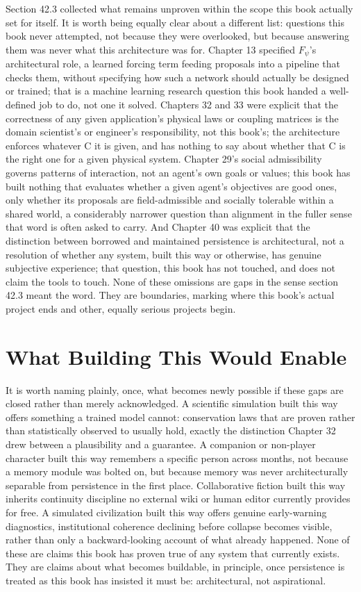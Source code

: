 Section 42.3 collected what remains unproven within the scope this book actually set for itself. It is worth being equally clear about a different list: questions this book never attempted, not because they were overlooked, but because answering them was never what this architecture was for. Chapter 13 specified \(F_\psi\)'s architectural role, a learned forcing term feeding proposals into a pipeline that checks them, without specifying how such a network should actually be designed or trained; that is a machine learning research question this book handed a well-defined job to do, not one it solved. Chapters 32 and 33 were explicit that the correctness of any given application's physical laws or coupling matrices is the domain scientist's or engineer's responsibility, not this book's; the architecture enforces whatever C it is given, and has nothing to say about whether that C is the right one for a given physical system. Chapter 29's social admissibility governs patterns of interaction, not an agent's own goals or values; this book has built nothing that evaluates whether a given agent's objectives are good ones, only whether its proposals are field-admissible and socially tolerable within a shared world, a considerably narrower question than alignment in the fuller sense that word is often asked to carry. And Chapter 40 was explicit that the distinction between borrowed and maintained persistence is architectural, not a resolution of whether any system, built this way or otherwise, has genuine subjective experience; that question, this book has not touched, and does not claim the tools to touch. None of these omissions are gaps in the sense section 42.3 meant the word. They are boundaries, marking where this book's actual project ends and other, equally serious projects begin.

\section{What Building This Would Enable}

It is worth naming plainly, once, what becomes newly possible if these gaps are closed rather than merely acknowledged. A scientific simulation built this way offers something a trained model cannot: conservation laws that are proven rather than statistically observed to usually hold, exactly the distinction Chapter 32 drew between a plausibility and a guarantee. A companion or non-player character built this way remembers a specific person across months, not because a memory module was bolted on, but because memory was never architecturally separable from persistence in the first place. Collaborative fiction built this way inherits continuity discipline no external wiki or human editor currently provides for free. A simulated civilization built this way offers genuine early-warning diagnostics, institutional coherence declining before collapse becomes visible, rather than only a backward-looking account of what already happened. None of these are claims this book has proven true of any system that currently exists. They are claims about what becomes buildable, in principle, once persistence is treated as this book has insisted it must be: architectural, not aspirational.

